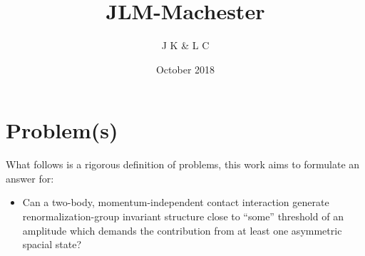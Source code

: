 \documentclass{article}
\title{JLM-Machester}
\author{J K \& L C}
\date{October 2018}
\begin{document}
\maketitle

\section{Problem(s)}
What follows is a rigorous definition of problems, this work aims to formulate an
answer for:
\begin{itemize}
    \item Can a two-body, momentum-independent contact interaction generate renormalization-group
    invariant structure close to ``some'' threshold of an amplitude which demands the contribution
    from at least one asymmetric spacial state?
\end{itemize}
\end{document}
